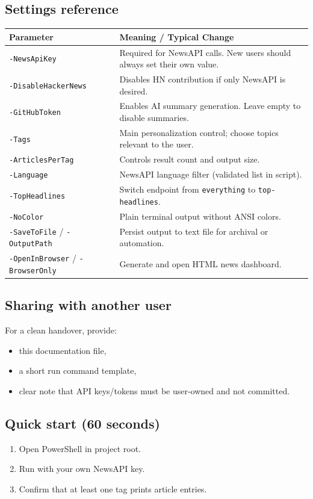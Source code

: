 \documentclass[11pt,a4paper]{article}
\begin{document}
\subsection{Settings reference}
\begin{longtable}{>{\raggedright\arraybackslash}p{} >{\raggedright\arraybackslash}p{}}
\textbf{Parameter} & \textbf{Meaning / Typical Change} \\
\hline
\texttt{-NewsApiKey} & Required for NewsAPI calls. New users should always set their own value. \\
\texttt{-DisableHackerNews} & Disables HN contribution if only NewsAPI is desired. \\
\texttt{-GitHubToken} & Enables AI summary generation. Leave empty to disable summaries. \\
\texttt{-Tags} & Main personalization control; choose topics relevant to the user. \\
\texttt{-ArticlesPerTag} & Controls result count and output size. \\
\texttt{-Language} & NewsAPI language filter (validated list in script). \\
\texttt{-TopHeadlines} & Switch endpoint from \texttt{everything} to \texttt{top-headlines}. \\
\texttt{-NoColor} & Plain terminal output without ANSI colors. \\
\texttt{-SaveToFile} / \texttt{-OutputPath} & Persist output to text file for archival or automation. \\
\texttt{-OpenInBrowser} / \texttt{-BrowserOnly} & Generate and open HTML news dashboard. \\
\end{longtable}

\subsection{Sharing with another user}
For a clean handover, provide:
\begin{itemize}
  \item this documentation file,
  \item a short run command template,
  \item clear note that API keys/tokens must be user-owned and not committed.
\end{itemize}

\subsection{Quick start (60 seconds)}
\begin{enumerate}
  \item Open PowerShell in project root.
  \item Run with your own NewsAPI key.
  \item Confirm that at least one tag prints article entries.
\end{enumerate}
\end{document}
